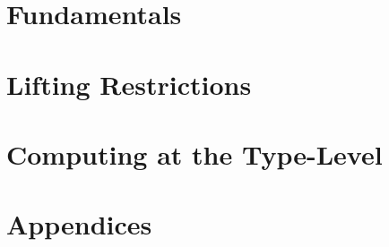 \documentclass[11pt]{book}
\begin{document}
\setlength\emergencystretch{\hsize}



\thispagestyle{empty}

\thispagestyle{empty}



\tableofcontents




\mainmatter




\part{Fundamentals}








\part{Lifting Restrictions}












\part{Computing at the Type-Level}
















\part{Appendices}


\end{document}
